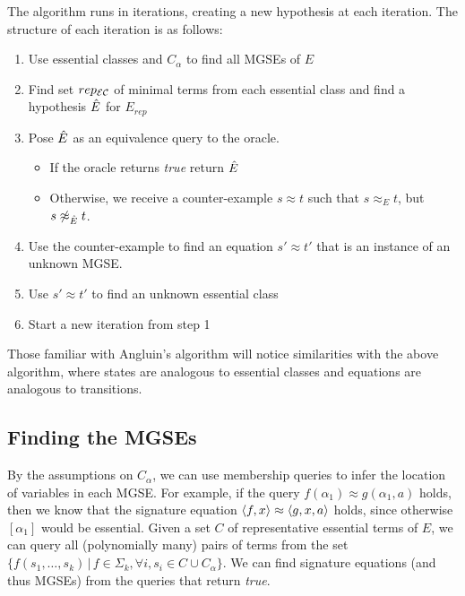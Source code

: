 The algorithm runs in iterations, creating a new hypothesis at each iteration.
The structure of each iteration is as follows:
\begin{enumerate}
\item Use essential classes and $C_{\alpha}$ to find all MGSEs of $E$
\item Find set $rep_{\mathcal{E}\mathcal{C}}$ of minimal terms from each essential class and find a hypothesis $\ahat{E}$ for $E_{rep}$
\item Pose $\ahat{E}$ as an equivalence query to the oracle.
	\begin{itemize}
	\item If the oracle returns \emph{true} return $\ahat{E}$
	\item Otherwise, we receive a counter-example $s\approx t$ such that $s \approx_E t$, but $s \not\approx_{\ahat{E}} t$.
	\end{itemize}
\item Use the counter-example to find an equation $s'\approx t'$ that is an instance of an unknown MGSE.
\item Use $s'\approx t'$ to find an unknown essential class
\item Start a new iteration from step 1
\end{enumerate}

Those familiar with Angluin's algorithm \citep{angluin87} will notice similarities with the above algorithm, where states are analogous to essential classes and equations are analogous to transitions. 


\subsection{Finding the MGSEs}


By the assumptions on $C_\alpha$, we can use membership queries to infer the location of variables in each MGSE.
For example, if the query $f(\alpha_1) \approx g(\alpha_1,a)$ holds, then we know that the signature equation $\langle f,x \rangle\approx\langle g,x,a \rangle$ holds, since otherwise $[\alpha_1]$ would be essential.
Given a set $C$ of representative essential terms of $E$, we can query all (polynomially many) pairs of terms from the set $\{f(s_1,\dots,s_k)  \, | \, f \in \Sigma_k, \forall i, s_i \in C \cup C_{\alpha} \}$. %
We can find signature equations (and thus MGSEs) from the queries that return \emph{true}.
  
